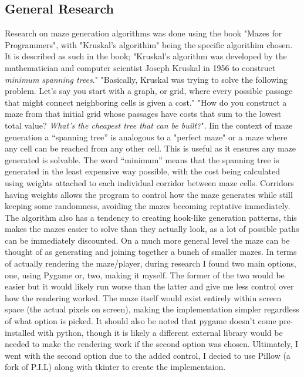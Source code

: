 \documentclass{article}
\begin{document}
\subsection{General Research}
Research on maze generation algorithms was done using the book "Mazes for Programmers", with "Kruskal's algorithim" being the specific algorithim
chosen. It is described as such in the book; "Kruskal's algorithm was developed by the mathematician and computer scientist Joseph Kruskal in 1956 to
construct \emph{minimum spanning trees}." "Basically, Kruskal was trying to solve the following problem. Let's say you start with a graph, or grid, where
every possible passage that might connect neighboring cells is given a cost." "How do you construct a maze from that initial grid whose passages have costs
that sum to the lowest total value? \emph{What's the cheapest tree that can be built?}". Iin the context of maze generation a ``spanning tree'' is analogous to a "perfect maze" or
a maze where any cell can be reached from any other cell. This is useful as it ensures any maze generated is solvable. The word ``minimum'' means that the 
spanning tree is generated in the least expensive way possible, with the cost being calculated using weights attached to each individual corridor between maze
cells. Corridors having weights allows the program to control how the maze generates while still keeping some randomness, avoiding the mazes becoming reptative immediately.
The algorithm also has a tendency to creating hook-like generation patterns, this makes the mazes easier to solve than they actually look, as a lot of possible paths can
be immediately discounted. On a much more general level the maze can be thought of as generating and joining together a bunch of smaller mazes.
\linebreak
\linebreak
In terms of actually rendering the maze/player, during research I found two main options, one, using Pygame or, two, making it myself. The former of the
two would be easier but it would likely run worse than the latter and give me less control over how the rendering worked. The maze itself would exist entirely 
within screen space (the actual pixels on screen), making the implementation simpler regardless of what option is picked. It should also be noted that pygame
doesn't come pre-installed with python, though it is likely a different external library would be needed to make the rendering work if the
second option was chosen.
Ultimately, I went with the second option due to the added control, I decied to use Pillow (a fork of P.I.L) along with tkinter to create the
implementaion.
\\
\linebreak
\linebreak
\end{document}
